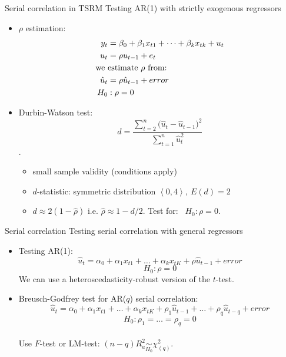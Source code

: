 \documentclass{beamer}
\begin{document}
\begin{frame}{Serial correlation in TSRM}
Testing AR(1) with strictly exogenous regressors\\ \medskip
\begin{itemize}
\item $\rho$ estimation:
\begin{align}\nonumber
y_t & = \beta_0+\beta_1 x_{t1}+\dots+\beta_k x_{tk}+u_t \\ \nonumber
u_t & = \rho u_{t-1} + e_t \\ \nonumber
\textnormal{we~}&\textnormal{estimate~}  \rho \textnormal{~from:} \\ \nonumber
\hat{u}_t &= \rho \hat{u}_{t-1}+error \\ \nonumber
H_0 & : \rho=0 \nonumber
\end{align}
\item Durbin-Watson test: $$d = \frac{\sum \limits^n_{t=2} \big(\hat{u}_t - \hat{u}_{t-1}\big)^2}{\sum \limits^n_{t=1}\hat{u}^2_t}$$.
\begin{itemize}
\item small sample validity (conditions apply)\\
\item $d$-statistic: symmetric distribution $\left\langle 0,4 \right\rangle, \> E(d)=2$
\item $ d \approx 2(1-\hat{\rho}) $    i.e.   $\hat{\rho} \approx 1-d/2$. Test for: \ $ H_0: \rho=0$.
\end{itemize}
\end{itemize}
\end{frame}
\begin{frame}{Serial correlation}
Testing serial correlation with general regressors\\ \medskip
\begin{itemize}
\item Testing AR(1):
$$\hat{u}_t=\alpha_0+\alpha_1 x_{t1} + \dots + \alpha_k x_{tK} + \rho \hat{u}_{t-1} + \textit{error}$$
$$H_0 : \rho = 0$$
We can use a heteroscedasticity-robust version of the $t$-test.\\ \bigskip
\item Breusch-Godfrey test for AR($q$) serial correlation:
$$\hat{u}_t=\alpha_0+\alpha_1 x_{t1} + \dots + \alpha_k x_{tK} + \rho_1 \hat{u}_{t-1} +\dots+ \rho_q \hat{u}_{t-q}+\textit{error}  $$
$$H_0 : \rho_1 = \dots = \rho_q = 0$$ \\ \medskip
Use $F$-test \quad or \quad LM-test: $(n-q)R_a^2 \underset{H_0}{\sim} \chi^2_{(q)}$.
\end{itemize}
\end{frame}
\end{document}
